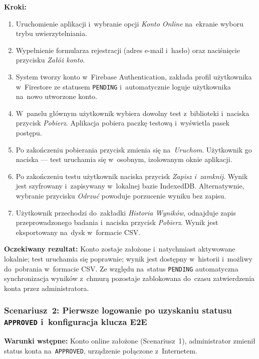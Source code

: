 \documentclass[12pt, a4paper, oneside]{report}
\begin{document}
\textbf{Kroki:}
\begin{enumerate}[noitemsep]
	\item Uruchomienie aplikacji i~wybranie opcji \textit{Konto Online} na~ekranie wyboru
	      trybu uwierzytelniania.
	\item Wypełnienie formularza rejestracji (adres e-mail i~hasło) oraz naciśnięcie
	      przycisku \textit{Załóż konto}.
	\item System tworzy konto w~Firebase Authentication, zakłada profil użytkownika
	      w~Firestore ze statusem \texttt{PENDING} i~automatycznie loguje użytkownika
	      na~nowo utworzone konto.
	\item W~panelu głównym użytkownik wybiera dowolny test z~biblioteki i~naciska
	      przycisk \textit{Pobierz}. Aplikacja pobiera paczkę testową i~wyświetla pasek postępu.
	\item Po zakończeniu pobierania przycisk zmienia się na~\textit{Uruchom}. Użytkownik
	      go naciska --- test uruchamia się w~osobnym, izolowanym oknie aplikacji.
	\item Po zakończeniu testu użytkownik naciska przycisk \textit{Zapisz i~zamknij}.
	      Wynik jest szyfrowany i~zapisywany w~lokalnej bazie IndexedDB. Alternatywnie,
	      wybranie przycisku \textit{Odrzuć} powoduje porzucenie wyniku bez zapisu.
	\item Użytkownik przechodzi do~zakładki \textit{Historia Wyników}, odnajduje zapis
	      przeprowadzonego badania i~naciska przycisk \textit{Pobierz}. Wynik jest
	      eksportowany na~dysk w~formacie CSV.
\end{enumerate}

\textbf{Oczekiwany rezultat:} Konto zostaje założone i~natychmiast aktywowane lokalnie;
test uruchamia się poprawnie; wynik jest dostępny w~historii i~możliwy do~pobrania w~formacie CSV.
Ze względu na~status \texttt{PENDING} automatyczna synchronizacja wyników z~chmurą pozostaje
zablokowana do~czasu zatwierdzenia konta przez administratora.

\subsubsection*{Scenariusz~2: Pierwsze logowanie po uzyskaniu statusu \texttt{APPROVED}
	i~konfiguracja klucza E2E}
\label{scen:2}

\textbf{Warunki wstępne:} Konto online założone (Scenariusz~1), administrator zmienił
status konta na~\texttt{APPROVED}, urządzenie połączone z~Internetem.
\end{document}

